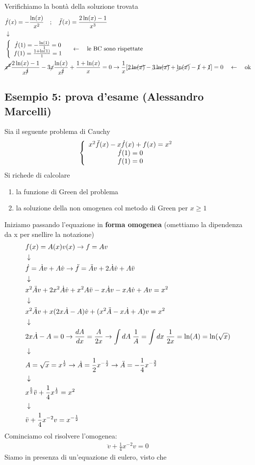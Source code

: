 Verifichiamo la bontà della soluzione trovata
\begin{align}
	&\dot{f}(x) = -\frac{\ln(x)}{x^2} \quad ; \quad \ddot{f}(x) = \frac{2\ln(x) -1}{x^3} \\ &\downarrow \nonumber \\
	&\left\{ \begin{array}{cc} \dot{f}(1) = -\frac{\ln(1)}{1}=0 \\ f(1) = \frac{1 + \ln(1)}{1} = 1 \end{array} \right. \quad \leftarrow \quad \text{le BC sono rispettate}\\
	&\cancel{x^2}\frac{2\ln(x) -1}{x^{\cancel{3}}} - 3\cancel{x} \frac{\ln(x)}{x^{\cancel{2}}} + \frac{1+\ln(x)}{x} = 0 \to \frac{1}{x}[\cancel{2\ln(x)} -\cancel{3\ln(x)} + \cancel{\ln(x)} -\cancel{1} +\cancel{1}] = 0 \quad \leftarrow \quad \text{ok}
\end{align}
\newpage 
\subsection{Esempio 5: prova d'esame (Alessandro Marcelli)}
Sia il seguente problema di Cauchy
\begin{align}
	\left\{ \begin{array}{ccc} x^2 \ddot{f}(x) - x \dot{f}(x) + f(x) = x^2\\ \dot{f}(1) = 0\\ f(1)=0 \end{array} \right.
\end{align}
Si richede di calcolare
\begin{enumerate}
	\item la funzione di Green del problema
	\item la soluzione della non omogenea col metodo di Green per $x\geq 1$
\end{enumerate}
Iniziamo passando l'equazione in \textbf{forma omogenea} (omettiamo la dipendenza da x per snellire la notazione)
\begin{align}
	&f(x) = A(x)v(x) \to f=Av\\ &\downarrow \nonumber \\
	&\dot{f} = \dot{A}v + A \dot{v} \to \ddot{f} = \ddot{A}v + 2 \dot{A}\dot{v} + A \ddot{v} \nonumber \\ &\downarrow \nonumber \\
	&x^2 \ddot{A}v + 2x^2 \dot{A}\dot{v} +x^2 A \ddot{v} -x\dot{A}v -x A \dot{v} + Av = x^2\nonumber \\ &\downarrow \nonumber \\
	& x^2 \ddot{A}v +x(2x \dot{A} - A) \dot{v} + (x^2 \ddot{A} - x \dot{A} + A)v = x^2\nonumber \\ &\downarrow \nonumber \\
	&2x \dot{A} - A = 0 \to \frac{dA}{dx} = \frac{A}{2x} \to \int dA \; \frac{1}{A} = \int dx \; \frac{1}{2x} = \ln(A) = \ln(\sqrt{x}) \nonumber \\ &\downarrow \nonumber \\
	&A = \sqrt{x} = x^{\frac{1}{2}} \to \dot{A} = \frac{1}{2}x^{-\frac{1}{2}} \to \ddot{A} = -\frac{1}{4}x^{-\frac{3}{2}} \nonumber \\ &\downarrow \nonumber \\
	&x^{\frac{5}{2}} \ddot{v} + \frac{1}{4} x^{\frac{1}{2}} = x^2\nonumber \\ &\downarrow \nonumber \\
	&\ddot{v} +\frac{1}{4} x^{-2} v = x^{-\frac{1}{2}}
\end{align}
Cominciamo col risolvere l'omogenea:
\begin{align}
	\ddot{v} +\frac{1}{4} x^{-2} v = 0 
\end{align}
Siamo in presenza di un'equazione di eulero, visto che
